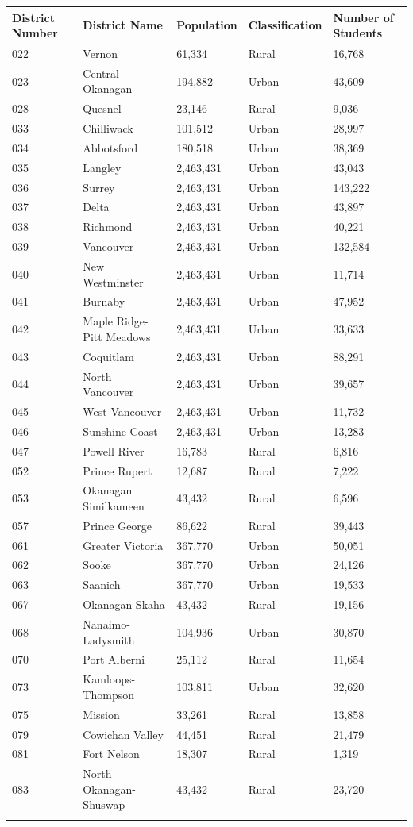 \documentclass[
  english,
  man,floatsintext]{apa6}
\begin{document}
\begin{table}[tbp]
\begin{center}
\begin{threeparttable}
\begin{tabular}{lllll}
\toprule
District Number & District Name & Population & Classification & Number of Students\\
\midrule
022 & Vernon & 61,334 & Rural & 16,768\\
023 & Central Okanagan & 194,882 & Urban & 43,609\\
028 & Quesnel & 23,146 & Rural & 9,036\\
033 & Chilliwack & 101,512 & Urban & 28,997\\
034 & Abbotsford & 180,518 & Urban & 38,369\\
035 & Langley & 2,463,431 & Urban & 43,043\\
036 & Surrey & 2,463,431 & Urban & 143,222\\
037 & Delta & 2,463,431 & Urban & 43,897\\
038 & Richmond & 2,463,431 & Urban & 40,221\\
039 & Vancouver & 2,463,431 & Urban & 132,584\\
040 & New Westminster & 2,463,431 & Urban & 11,714\\
041 & Burnaby & 2,463,431 & Urban & 47,952\\
042 & Maple Ridge-Pitt Meadows & 2,463,431 & Urban & 33,633\\
043 & Coquitlam & 2,463,431 & Urban & 88,291\\
044 & North Vancouver & 2,463,431 & Urban & 39,657\\
045 & West Vancouver & 2,463,431 & Urban & 11,732\\
046 & Sunshine Coast & 2,463,431 & Urban & 13,283\\
047 & Powell River & 16,783 & Rural & 6,816\\
052 & Prince Rupert & 12,687 & Rural & 7,222\\
053 & Okanagan Similkameen & 43,432 & Rural & 6,596\\
057 & Prince George & 86,622 & Rural & 39,443\\
061 & Greater Victoria & 367,770 & Urban & 50,051\\
062 & Sooke & 367,770 & Urban & 24,126\\
063 & Saanich & 367,770 & Urban & 19,533\\
067 & Okanagan Skaha & 43,432 & Rural & 19,156\\
068 & Nanaimo-Ladysmith & 104,936 & Urban & 30,870\\
070 & Port Alberni & 25,112 & Rural & 11,654\\
073 & Kamloops-Thompson & 103,811 & Urban & 32,620\\
075 & Mission & 33,261 & Rural & 13,858\\
079 & Cowichan Valley & 44,451 & Rural & 21,479\\
081 & Fort Nelson & 18,307 & Rural & 1,319\\
083 & North Okanagan-Shuswap & 43,432 & Rural & 23,720\\
\bottomrule
\addlinespace
\end{tabular}


\end{threeparttable}
\end{center}
\end{table}
\end{document}
